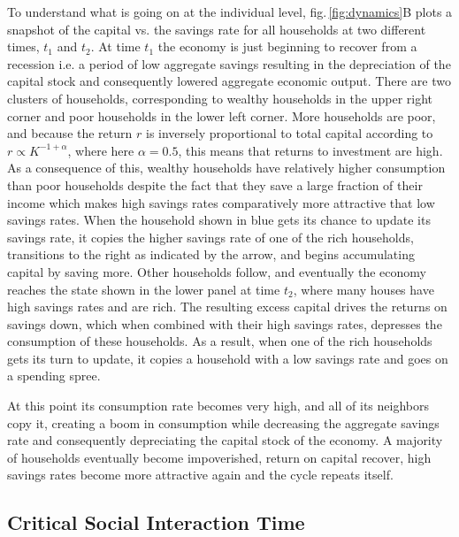 To understand what is going on at the individual level, fig.\,\ref{fig:dynamics}B plots a snapshot of the capital vs. the savings rate for all households at two different times, $t_1$ and $t_2$. 
At time $t_1$ the economy is just beginning to recover from a recession i.e. a period of low aggregate savings resulting in the depreciation of the capital stock and consequently lowered aggregate economic output. 
There are two clusters of households, corresponding to wealthy households in the upper right corner and poor households in the lower left corner.
More households are poor, and because the return $r$ is inversely proportional to total capital according to $r \propto K^{-1 + \alpha}$, where here $\alpha = 0.5$, this means that returns to investment are high. 
As a consequence of this, wealthy households have relatively higher consumption than poor households despite the fact that they save a large fraction of their income which makes high savings rates comparatively more attractive that low savings rates. 
When the household shown in blue gets its chance to update its savings rate, it copies the higher savings rate of one of the rich households, transitions to the right as indicated by the arrow, and begins accumulating capital by saving more.
Other households follow, and eventually the economy reaches the state shown in the lower panel at time $t_2$, where many houses have high savings rates and are rich.
The resulting excess capital drives the returns on savings down, which when combined with their high savings rates, depresses the consumption of these households.
As a result, when one of the rich households gets its turn to update, it copies a household with a low savings rate and goes on a spending spree.  

At this point its consumption rate becomes very high, and all of its neighbors copy it, creating a boom in consumption while decreasing the aggregate savings rate and consequently depreciating the capital stock of the economy.
A majority of households eventually become impoverished, return on capital recover, high savings rates become more attractive again and the cycle repeats itself.
\newpage
\subsection{Critical Social Interaction Time}
\label{sec:savings_critical_tau}

